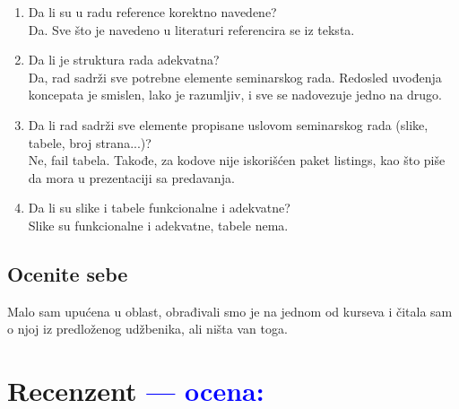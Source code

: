 \documentclass[a4paper]{report}
\newcommand{\odgovor}[1]{\textcolor{blue}{#1}}
\begin{document}
\begin{enumerate}
\begin{verbatim}
\usepackage[utf8]{inputenc}
\usepackage[english,serbian]{babel}
\usepackage[fixlanguage]{babelbib}
\end{verbatim}

I navođenjem literature na sledeći način:

\begin{verbatim}
\addcontentsline{toc}{section}{Literatura}
\appendix
\selectbiblanguage{serbian}


\end{verbatim}


\odgovor{Ispravljeno za mesece. Obrisano online at.}

\item Da li su u radu reference korektno navedene?\\
Da. Sve što je navedeno u literaturi referencira se iz teksta.

\item Da li je struktura rada adekvatna?\\
Da, rad sadrži sve potrebne elemente seminarskog rada. Redosled uvođenja koncepata je smislen, lako je razumljiv, i sve se nadovezuje jedno na drugo.

\item Da li rad sadrži sve elemente propisane uslovom seminarskog rada (slike, tabele, broj strana...)?\\
Ne, fail tabela. Takođe, za kodove nije iskorišćen paket listings, kao što piše da mora u prezentaciji sa predavanja.

\item Da li su slike i tabele funkcionalne i adekvatne?\\
Slike su funkcionalne i adekvatne, tabele nema.
\end{enumerate}

\section{Ocenite sebe}
Malo sam upućena u oblast, obrađivali smo je na jednom od kurseva i čitala sam o njoj iz predloženog udžbenika, ali ništa van toga.


\chapter{Recenzent \odgovor{--- ocena:} }
\end{document}
